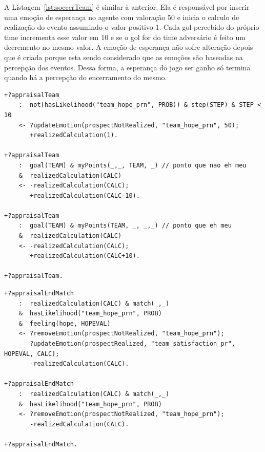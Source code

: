 A Listagem~\ref{lst:soccerTeam} é similar à anterior. Ela é responsável por inserir uma
emoção de esperança no agente com valoração 50 e inicia o calculo de
realização do evento assumindo o valor positivo 1. Cada gol percebido
do próprio time incrementa esse valor em 10 e se o gol for do time
adversário é feito um decremento no mesmo valor. A emoção de esperança não
sofre alteração depois que é criada porque esta sendo considerado que as
emoções são baseadas na percepção dos eventos. Dessa forma, a esperança do
jogo ser ganho só termina quando há a percepção do encerramento do mesmo.

\begin{center}
    \begin{minipage}{130mm}
	\lstset{linewidth=130mm}
	\begin{lstlisting}[frame=trbl,
caption=Parte do código do agente referente ao andamento do jogo,
label=lst:soccerTeam]
+?appraisalTeam
    :  not(hasLikelihood("team_hope_prn", PROB)) & step(STEP) & STEP < 10
    <- ?updateEmotion(prospectNotRealized, "team_hope_prn", 50);
       +realizedCalculation(1).

+?appraisalTeam
    :  goal(TEAM) & myPoints(_,_, TEAM, _) // ponto que nao eh meu
    &  realizedCalculation(CALC)
    <- -realizedCalculation(CALC);
       +realizedCalculation(CALC-10).

+?appraisalTeam
    :  goal(TEAM) & myPoints(TEAM, _, _,_) // ponto que eh meu
    &  realizedCalculation(CALC)
    <- -realizedCalculation(CALC);
       +realizedCalculation(CALC+10).

+?appraisalTeam.
	\end{lstlisting}
    \end{minipage}
\end{center}

\begin{center}
    \begin{minipage}{140mm}
	\lstset{linewidth=140mm}
	\begin{lstlisting}[frame=trbl,
caption=Parte do código do agente referente à avaliação do final do jogo para
as emoções de probabilidade,
label=lst:soccerEnd1]
+?appraisalEndMatch
    :  realizedCalculation(CALC) & match(_,_)
    &  hasLikelihood("team_hope_prn", PROB)
    &  feeling(hope, HOPEVAL)
    <- ?removeEmotion(prospectNotRealized, "team_hope_prn");
       ?updateEmotion(prospectRealized, "team_satisfaction_pr", HOPEVAL, CALC);
       -realizedCalculation(CALC).

+?appraisalEndMatch
    :  realizedCalculation(CALC) & match(_,_)
    &  hasLikelihood("team_hope_prn", PROB)
    <- ?removeEmotion(prospectNotRealized, "team_hope_prn");
       -realizedCalculation(CALC).

+?appraisalEndMatch.
	\end{lstlisting}
    \end{minipage}
\end{center}

